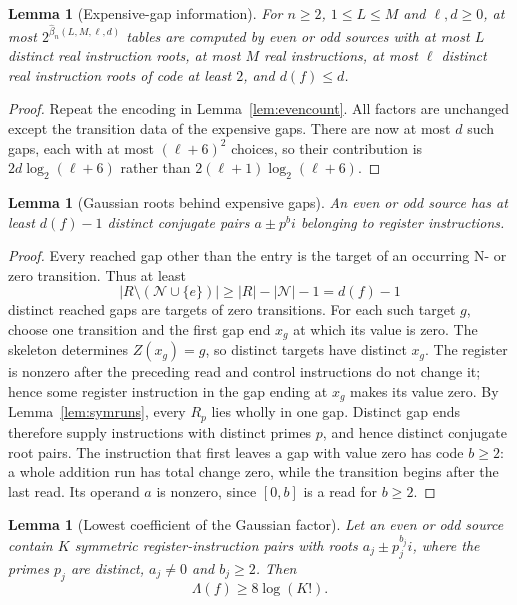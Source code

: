 \documentclass[11pt]{article}
\newtheorem{lemma}[theorem]{Lemma}
\theoremstyle{remark}
\begin{document}
\begin{lemma}[Expensive-gap information]\label{lem:expensive-count}
For $n\ge2$, $1\le L\le M$ and $\ell,d\ge0$, at most
$2^{\widehat\beta_n(L,M,\ell,d)}$ tables are computed by even or odd sources
with at most $L$ distinct real instruction roots, at most $M$ real
instructions, at most $\ell$ distinct real instruction roots of code at
least $2$, and $d(f)\le d$.
\end{lemma}

\begin{proof}
Repeat the encoding in Lemma~\ref{lem:evencount}.  All factors are unchanged
except the transition data of the expensive gaps.  There are now at most $d$
such gaps, each with at most $(\ell+6)^2$ choices, so their contribution is
$2d\log_2(\ell+6)$ rather than $2(\ell+1)\log_2(\ell+6)$.
\end{proof}

\begin{lemma}[Gaussian roots behind expensive gaps]\label{lem:expensive-gaussian}
An even or odd source has at least $d(f)-1$ distinct conjugate pairs
$a\mathbin\pm p^bi$ belonging to register instructions.
\end{lemma}

\begin{proof}
Every reached gap other than the entry is the target of an occurring N- or
zero transition.  Thus at least
\[
 |R\setminus(\mathcal N\cup\{e\})|\ge |R|-|\mathcal N|-1=d(f)-1
\]
distinct reached gaps are targets of zero transitions.  For each such target
$g$, choose one transition and the first gap end $x_g$ at which its value is
zero.  The skeleton determines $Z(x_g)=g$, so distinct targets have distinct
$x_g$.  The register is nonzero after the preceding read and control
instructions do not change it; hence some register instruction in the gap
ending at $x_g$ makes its value zero.  By Lemma~\ref{lem:symruns}, every
$R_p$ lies wholly in one gap.  Distinct gap ends therefore supply instructions
with distinct primes $p$, and hence distinct conjugate root pairs.  The
instruction that first leaves a gap with value zero has code $b\ge2$: a
whole addition run has total change zero, while the transition begins after
the last read.  Its operand $a$ is nonzero, since $[0,b]$ is a read for
$b\ge2$.
\end{proof}

\begin{lemma}[Lowest coefficient of the Gaussian factor]\label{lem:gaussian-low}
Let an even or odd source contain $K$ symmetric register-instruction pairs
with roots $a_j\mathbin\pm p_j^{b_j}i$, where the primes $p_j$ are distinct,
$a_j\ne0$ and $b_j\ge2$.  Then
\[
 \Lambda(f)\ge8\log(K!).
\]
\end{lemma}
\end{document}
